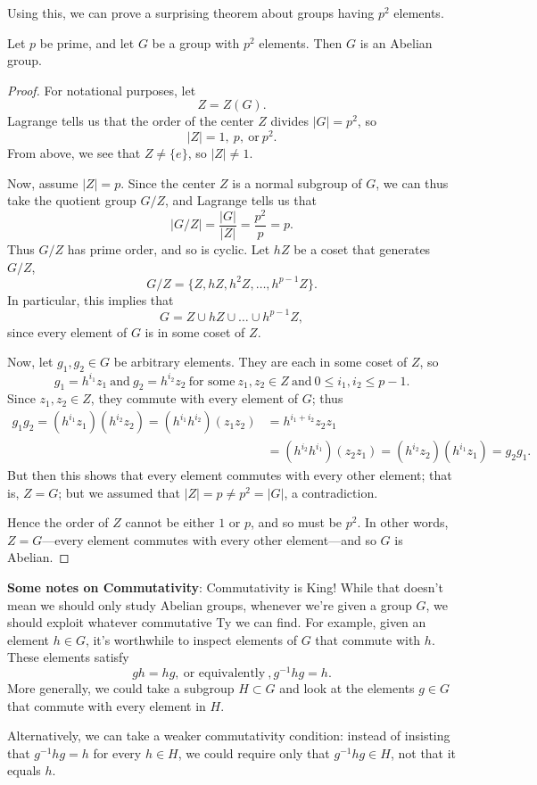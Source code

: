 \documentclass[math1530-lecture-notes]{subfiles}
\begin{document}
Using this, we can prove a surprising theorem about groups having $p^2$ elements.
\begin{corollary}{}
  Let $p$ be prime, and let $G$ be a group with $p^2$ elements. Then $G$ is an Abelian group.
\end{corollary}
\begin{proof}[Proof]
  For notational purposes, let \[
    Z=Z(G)
  .\] Lagrange tells us that the order of the center $Z$ divides $\left| G \right| =p^2$, so \[
    \left| Z \right| =1,\ p,~\text{or}~p^2
  .\] From above, we see that $ Z \neq \{ e \}$, so $\left| Z \right| \neq 1$.

  Now, assume $\left| Z \right| =p$. Since the center $Z$ is a normal subgroup of $G$, we can thus
  take the quotient group $G / Z$, and Lagrange tells us that \[
    \left| G / Z \right| = \frac{\left| G \right| }{\left| Z \right| }=\frac{p^2}{p}=p
  .\] Thus $G / Z$ has prime order, and so is cyclic. Let $hZ$ be a coset that generates $G / Z$, \[
    G / Z=\{ Z,hZ,h^2Z,\ldots,h^{p-1}Z \}
  .\] In particular, this implies that \[
    G=Z\cup hZ\cup \ldots\cup h^{p-1}Z
  ,\] since every element of $G$ is in some coset of $Z$.

  Now, let $g_1,g_2\in G$ be arbitrary elements. They are each in some coset of $Z$, so \[
    g_1=h^{i_1}z_1~\text{and}~g_2=h^{i_2}z_2~\text{for some}~z_1,z_2\in Z~\text{and}~0\le i_1,i_2\le
    p-1
  .\] Since $z_1,z_2\in Z$, they commute with every element of $G$; thus
  \begin{align*}
    g_1g_2=(h^{i_1}z_1)(h^{i_2}z_2)=(h^{i_1}h^{i_2})(z_1z_2)&= h^{i_1+i_2}z_2z_1 \\
    &= (h^{i_2}h^{i_1})(z_2z_1)=(h^{i_2}z_2)(h^{i_1}z_1)=g_2g_1
  .\end{align*}
  But then this shows that every element commutes with every other element; that is, $Z=G$; but we
  assumed that $\left| Z \right| =p\neq p^2=\left| G \right| $, a contradiction.

  Hence the order of $Z$ cannot be either $1$ or $p$, and so must be $p^2$. In other words,
  $Z=G$---every element commutes with every other element---and so $G$ is Abelian.
\end{proof}

\begin{remark}
  \textbf{Some notes on Commutativity}: Commutativity is King! While that doesn't mean we should
  only study Abelian groups, whenever we're given a group $G$, we should exploit whatever
  commutative Ty we can find. For example, given an element $h\in G$, it's worthwhile to inspect
  elements of $G$ that commute with $h$. These elements satisfy \[
    gh=hg,~\text{or equivalently}~, g^{-1}hg=h
  .\] More generally, we could take a subgroup $H\subset G$ and look at the elements $g\in G$ that
  commute with every element in $H$.

  Alternatively, we can take a weaker commutativity condition: instead of insisting that
  $g^{-1}hg=h$ for every $h\in H$, we could require only that $g^{-1}hg\in H$, not that it equals
  $h$. 
\end{remark}
\end{document}
